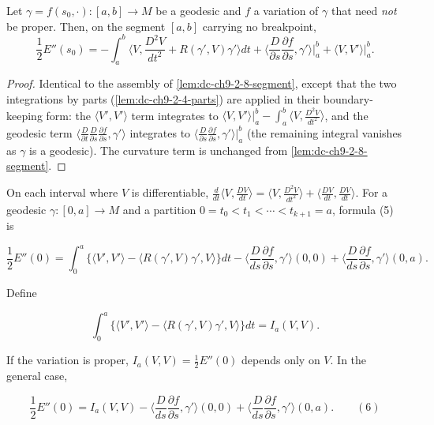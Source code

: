 \begin{lemma}
  \label{lem:dc-ch9-2-9-segment}


  Let $\gamma=f(s_0,\cdot):[a,b]\to M$ be a geodesic and $f$ a variation of $\gamma$ that need
  \emph{not} be proper. Then, on the segment $[a,b]$ carrying no breakpoint,
  $$
  \frac{1}{2}E''(s_0)=-\int_a^b\Big\langle V,\frac{D^2 V}{dt^2}+R(\gamma',V)\gamma'\Big\rangle dt
    +\Big\langle\frac{D}{\partial s}\frac{\partial f}{\partial s},\gamma'\Big\rangle\Big|_a^b
    +\big\langle V,V'\big\rangle\Big|_a^b .
  $$

\end{lemma}
\begin{proof}

  \sketch
  Identical to the assembly of \cref{lem:dc-ch9-2-8-segment}, except that the two integrations
  by parts (\cref{lem:dc-ch9-2-4-parts}) are applied in their boundary-keeping form: the
  $\langle V',V'\rangle$ term integrates to
  $\langle V,V'\rangle|_a^b-\int_a^b\langle V,\frac{D^2V}{dt^2}\rangle$, and the geodesic term
  $\langle\frac{D}{\partial t}\frac{D}{\partial s}\frac{\partial f}{\partial s},\gamma'\rangle$
  integrates to $\langle\frac{D}{\partial s}\frac{\partial f}{\partial s},\gamma'\rangle|_a^b$
  (the remaining integral vanishes as $\gamma$ is a geodesic). The curvature term is unchanged
  from \cref{lem:dc-ch9-2-8-segment}.
\end{proof}
\begin{remark}
  \label{rem:dc-ch9-2-10}

  On each interval where $V$ is differentiable,
  $\frac{d}{dt}\langle V,\frac{DV}{dt}\rangle=\langle V,\frac{D^2 V}{dt^2}\rangle+\langle\frac{DV}{dt},\frac{DV}{dt}\rangle$.
  For a geodesic $\gamma:[0,a]\to M$ and a partition
  $0=t_0<t_1<\cdots<t_{k+1}=a$, formula (5) is

  $$
  \frac{1}{2}E''(0)=\int_0^a\{\langle V',V'\rangle-\langle R(\gamma',V)\gamma',V\rangle\}dt-\Big\langle\frac{D}{ds}\frac{\partial f}{\partial s},\gamma'\Big\rangle(0,0)+\Big\langle\frac{D}{ds}\frac{\partial f}{\partial s},\gamma'\Big\rangle(0,a).
  $$

  Define

  $$
  \int_0^a\{\langle V',V'\rangle-\langle R(\gamma',V)\gamma',V\rangle\}dt=I_a(V,V).
  $$

  If the variation is proper, $I_a(V,V)=\frac{1}{2}E''(0)$ depends only on $V$. In
  the general case,

  $$
  \frac{1}{2}E''(0)=I_a(V,V)-\Big\langle\frac{D}{ds}\frac{\partial f}{\partial s},\gamma'\Big\rangle(0,0)+\Big\langle\frac{D}{ds}\frac{\partial f}{\partial s},\gamma'\Big\rangle(0,a).\qquad(6)
  $$
\end{remark}
